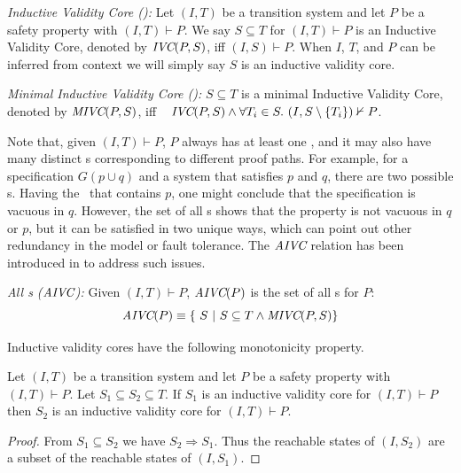 \begin{definition}{\emph{Inductive Validity Core (\ivc):}}
  \label{def:ivc}
  Let $(I, T)$ be a transition system and let $P$ be a
  safety property with $(I, T)\vdash P$.
  We say $S \subseteq T$ for $(I, T)\vdash P$ is an Inductive Validity Core,
  denoted by $\textit{IVC}(P, S)$, iff $(I, S) \vdash P $.
  When $I$, $T$, and $P$ can be inferred from
  context we will simply say $S$ is an inductive validity core.
\end{definition}

\begin{definition}{\emph{Minimal Inductive Validity Core (\mivc):}}
  \label{def:minimal-ivc}
  $S \subseteq T$ is a minimal Inductive Validity Core,
  denoted by $\textit{MIVC}(P, S)$, iff ~
  $\textit{IVC}(P, S) \wedge \forall T_i \in S.~ (I, S\setminus\{ T_i \}) \nvdash P$.
\end{definition}

Note that, given $(I, T) \vdash P$, $P$ always has at least one \mivc, and it may also have many distinct {\mivc}s corresponding to different proof paths.
For example, for a specification $G(p \cup q)$ and a system that satisfies $p$ and $q$, there are two possible \mivc s. Having the \mivc\ that contains $p$, one might conclude that the specification is vacuous in $q$. However, the set of all \mivc s shows that the property is not vacuous in $q$ or $p$, but it can be satisfied in two unique ways, which can point out other redundancy in the model or fault tolerance. The $\textit{AIVC}$ relation has been introduced in \cite{Murugesan16:renext} to address such issues.
\begin{definition}{\emph{All {\mivc}s ($\textit{AIVC}$):}}
    \label{def:allivcs}
    Given $(I, T) \vdash P$, $\textit{AIVC}(P)$ is the set of all \mivc s for $P$:
    $$ \textit{AIVC}(P) \equiv  \{\ S~|~S \subseteq T \land  \textit{MIVC}(P, S)\} $$
\end{definition}


Inductive validity cores have the following monotonicity property.

\begin{lemma}
  \label{lem:ivc-monotonic}
  Let $(I, T)$ be a transition system and let $P$ be a safety property
  with $(I, T)\vdash P$. Let $S_1 \subseteq S_2 \subseteq T$. If $S_1$
  is an inductive validity core for $(I, T)\vdash P$ then $S_2$ is an
  inductive validity core for $(I, T)\vdash P$.
\end{lemma}
\begin{proof}
  From $S_1 \subseteq S_2$ we have $S_2 \Rightarrow S_1$. Thus the
  reachable states of $(I, S_2)$ are a subset of the reachable states
  of $(I, S_1)$.
\end{proof}

